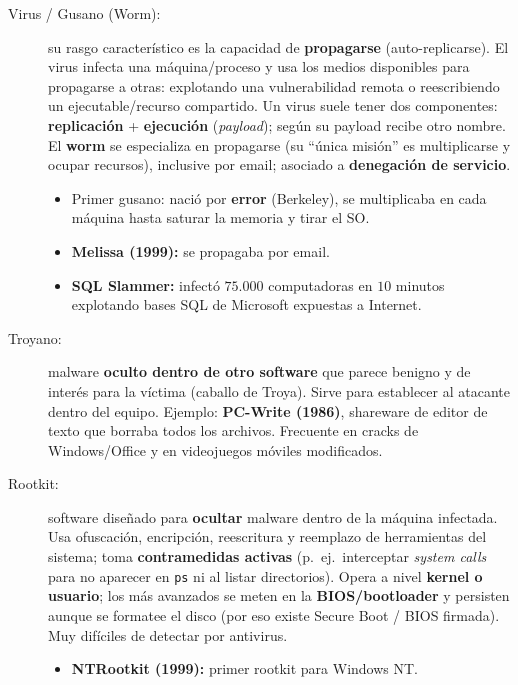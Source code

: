 \documentclass[../main.tex]{subfiles}
\begin{document}
\begin{description}
  \item[Virus / Gusano (Worm):] su rasgo característico es la capacidad de
        \textbf{propagarse} (auto-replicarse). El virus infecta una máquina/proceso
        y usa los medios disponibles para propagarse a otras: explotando una
        vulnerabilidad remota o reescribiendo un ejecutable/recurso compartido. Un
        virus suele tener dos componentes: \textbf{replicación} + \textbf{ejecución}
        (\textit{payload}); según su payload recibe otro nombre. El \textbf{worm}
        se especializa en propagarse (su ``única misión'' es multiplicarse y ocupar
        recursos), inclusive por email; asociado a \textbf{denegación de servicio}.
        \begin{itemize}[noitemsep]
          \item Primer gusano: nació por \textbf{error} (Berkeley), se multiplicaba
                en cada máquina hasta saturar la memoria y tirar el SO.
          \item \textbf{Melissa (1999):} se propagaba por email.
          \item \textbf{SQL Slammer:} infectó $75.000$ computadoras en $10$ minutos
                explotando bases SQL de Microsoft expuestas a Internet.
        \end{itemize}
  \item[Troyano:] malware \textbf{oculto dentro de otro software} que parece
        benigno y de interés para la víctima (caballo de Troya). Sirve para
        establecer al atacante dentro del equipo. Ejemplo: \textbf{PC-Write (1986)},
        shareware de editor de texto que borraba todos los archivos. Frecuente en
        cracks de Windows/Office y en videojuegos móviles modificados.
  \item[Rootkit:] software diseñado para \textbf{ocultar} malware dentro de la
        máquina infectada. Usa ofuscación, encripción, reescritura y reemplazo de
        herramientas del sistema; toma \textbf{contramedidas activas} (p.\ ej.\
        interceptar \textit{system calls} para no aparecer en \texttt{ps} ni al
        listar directorios). Opera a nivel \textbf{kernel o usuario}; los más
        avanzados se meten en la \textbf{BIOS/bootloader} y persisten aunque se
        formatee el disco (por eso existe Secure Boot / BIOS firmada). Muy difíciles
        de detectar por antivirus.
        \begin{itemize}[noitemsep]
          \item \textbf{NTRootkit (1999):} primer rootkit para Windows NT.

\end{itemize}
\end{description}
\end{document}

